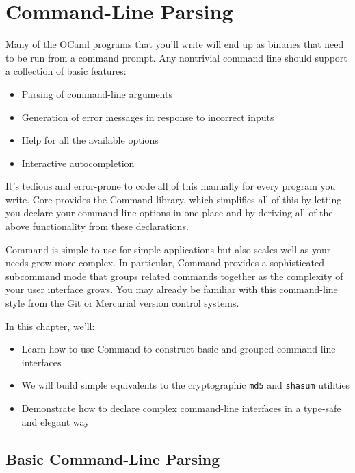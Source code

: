 \hypertarget{command-line-parsing}{%
\section{Command-Line Parsing}\label{command-line-parsing}}

Many of the OCaml programs that you'll write will end up as binaries
that need to be run from a command prompt. Any nontrivial command line
should support a collection of basic features:

\begin{itemize}
\item
  Parsing of command-line arguments
\item
  Generation of error messages in response to incorrect inputs
\item
  Help for all the available options
\item
  Interactive autocompletion
\end{itemize}

It's tedious and error-prone to code all of this manually for every
program you write. Core provides the Command library, which simplifies
all of this by letting you declare your command-line options in one
place and by deriving all of the above functionality from these
declarations. 

Command is simple to use for simple applications but also scales well as
your needs grow more complex. In particular, Command provides a
sophisticated subcommand mode that groups related commands together as
the complexity of your user interface grows. You may already be familiar
with this command-line style from the Git or Mercurial version control
systems.

In this chapter, we'll:

\begin{itemize}
\item
  Learn how to use Command to construct basic and grouped command-line
  interfaces
\item
  We will build simple equivalents to the cryptographic
  \passthrough{\lstinline!md5!} and \passthrough{\lstinline!shasum!}
  utilities
\item
  Demonstrate how to declare complex command-line interfaces in a
  type-safe and elegant way 
\end{itemize}

\hypertarget{basic-command-line-parsing}{%
\subsection{Basic Command-Line
Parsing}\label{basic-command-line-parsing}}

